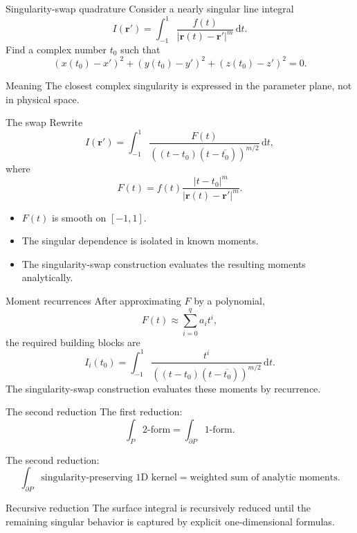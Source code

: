 \documentclass[aspectratio=169,11pt]{beamer}
\newcommand{\dd}{\,\mathrm d}
\newcommand{\rvec}{\bm{r}}
\newcommand{\rp}{\bm{r}'}
\begin{document}
\begin{frame}{Singularity-swap quadrature}
\small
Consider a nearly singular line integral
\[
  I(\rp)=\int_{-1}^1
  \frac{f(t)}{|\rvec(t)-\rp|^m}\dd t.
\]
Find a complex number $t_0$ such that
\[
  (x(t_0)-x')^2
  +(y(t_0)-y')^2
  +(z(t_0)-z')^2
  =
  0.
\]

\begin{block}{Meaning}
The closest complex singularity is expressed in the parameter plane, not in
physical space.
\end{block}
\end{frame}

\begin{frame}{The swap}
\small
Rewrite
\[
  I(\rp)
  =
  \int_{-1}^1
  \frac{F(t)}
       {((t-t_0)(t-\overline{t_0}))^{m/2}}
  \dd t,
\]
where
\[
  F(t)
  =
  f(t)
  \frac{|t-t_0|^m}{|\rvec(t)-\rp|^m}.
\]

\begin{itemize}
  \item $F(t)$ is smooth on $[-1,1]$.
  \item The singular dependence is isolated in known moments.
  \item The singularity-swap construction evaluates the resulting moments
  analytically.
\end{itemize}
\end{frame}

\begin{frame}{Moment recurrences}
\small
After approximating $F$ by a polynomial,
\[
  F(t)\approx\sum_{i=0}^{q}a_i t^i,
\]
the required building blocks are
\[
  I_i(t_0)
  =
  \int_{-1}^1
  \frac{t^i}
       {((t-t_0)(t-\overline{t_0}))^{m/2}}
  \dd t.
\]
The singularity-swap construction evaluates these moments by recurrence.
\end{frame}

\begin{frame}{The second reduction}
\small
The first reduction:
\[
  \int_P \text{2-form}
  =
  \int_{\partial P}\text{1-form}.
\]

The second reduction:
\[
  \int_{\partial P}\text{singularity-preserving 1D kernel}
  =
  \text{weighted sum of analytic moments}.
\]

\begin{block}{Recursive reduction}
The surface integral is recursively reduced until the remaining singular
behavior is captured by explicit one-dimensional formulas.
\end{block}
\end{frame}
\end{document}
